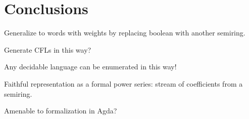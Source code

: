 \section{Conclusions}
\label{sec:conclusions}

Generalize to words with weights by replacing boolean with another semiring.

Generate CFLs in this way?

Any decidable language can be enumerated in this way!

Faithful representation as a formal power series: stream of coefficients from a semiring.

Amenable to formalization in Agda?

